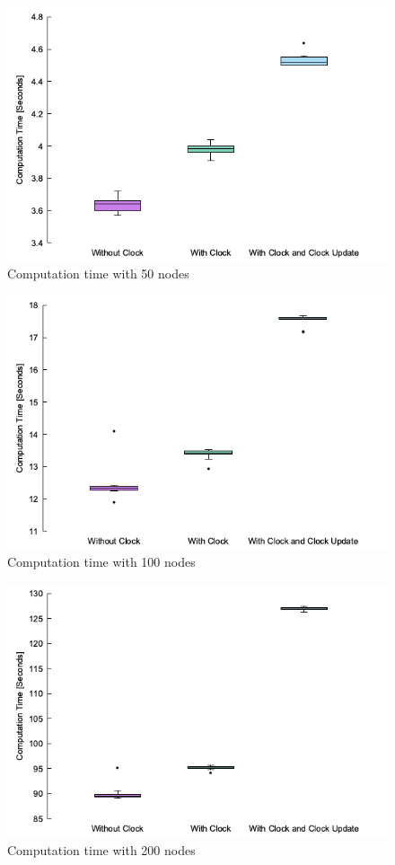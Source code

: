 \documentclass[times, twoside, watermark]{zHenriquesLab-StyleBioRxiv}
\begin{document}
\begin{figure}[h]
\centering
\includegraphics[width=.8\linewidth]{Figures/computation50.png}
\caption{Computation time with 50 nodes}
\label{fig:50nodes}
\end{figure}
\begin{figure}%
\centering
\includegraphics[width=.8\linewidth]{Figures/computation100.png}
\caption{Computation time with 100 nodes}
\label{fig:100nodes}
\end{figure}
\begin{figure}%
\centering
\includegraphics[width=.8\linewidth]{Figures/computation200.png}
\caption{Computation time with 200 nodes}
\label{fig:200nodes}
\end{figure}
\end{document}
